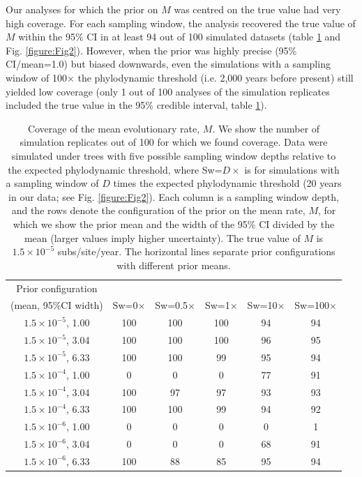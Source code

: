 \documentclass[11pt]{article}
\begin{document}
Our analyses for which the prior on $M$ was centred on the true value had very high coverage. For each sampling window, the analysis recovered the true value of $M$ within the 95\% CI in at least 94 out of 100 simulated datasets (table \ref{table:coverage} and Fig. \ref{figure:Fig2}). However, when the prior was highly precise (95\% CI/mean=1.0) but biased downwards, even the simulations with a sampling window of 100$\times$ the phylodynamic threshold (i.e. 2,000 years before present) still yielded low coverage (only 1 out of 100 analyses of the simulation replicates included the true value in the 95\% credible interval, table \ref{table:coverage}).

\begin{table}[H]
	\caption{Coverage of the mean evolutionary rate, $M$. We show the number of simulation replicates out of 100 for which we found coverage. Data were simulated under trees with five possible sampling window depths relative to the expected phylodynamic threshold, where Sw=$D\times$ is for simulations with a sampling window of $D$ times the expected phylodynamic threshold (20 years in our data; see Fig. \ref{figure:Fig2}). Each column is a sampling window depth, and the rows denote the configuration of the prior on the mean rate, $M$, for which we show the prior mean and the width of the 95\% CI divided by the mean (larger values imply higher uncertainty). The true value of $M$ is $1.5\times 10^{-5}$ subs/site/year. The horizontal lines separate prior configurations with different prior means.} 
	\begin{center} 
		\label{table:coverage}
		\begin{tabular}{ c|c|c|c|c|c }
          	Prior configuration\\(mean, 95\%CI width) &	Sw=0$\times$  & Sw=0.5$\times$ & Sw=1$\times$ & Sw=10$\times$ & Sw=100$\times$ \\			
			\hline
			$1.5\times10^{-5}$, 1.00 & 100 & 100 & 100 & 94 & 94\\
            $1.5\times10^{-5}$, 3.04 & 100 & 100 & 100 & 96 & 95\\
			$1.5\times10^{-5}$, 6.33 & 100 & 100 & 99 & 95 & 94\\
			\hline
			$1.5\times10^{-4}$, 1.00 & 0 & 0 & 0 & 77 & 91\\
            $1.5\times10^{-4}$, 3.04 & 100 & 97 & 97 & 93 & 93\\
			$1.5\times10^{-4}$, 6.33 & 100 & 100 & 99 & 94 & 92\\
			\hline
			$1.5\times10^{-6}$, 1.00 & 0 & 0 & 0 & 0 & 1\\
            $1.5\times10^{-6}$, 3.04 & 0 & 0 & 0 & 68 & 91\\
			$1.5\times10^{-6}$, 6.33 & 100 & 88 & 85 & 95 & 94\\
		\end{tabular}
	\end{center}
\end{table}
\end{document}
